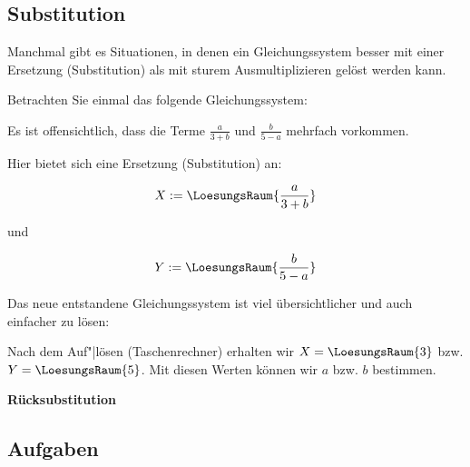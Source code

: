 \subsection{Substitution}
Manchmal gibt es Situationen, in denen ein Gleichungssystem besser mit
einer Ersetzung (Substitution) als mit sturem Ausmultiplizieren gelöst
werden kann.

Betrachten Sie einmal das folgende Gleichungssystem:


Es ist offensichtlich, dass die Terme $\frac{a}{3+b}$ und
$\frac{b}{5-a}$ mehrfach vorkommen.

Hier bietet sich eine Ersetzung (Substitution) an:

$$X := \LoesungsRaum{\frac{a}{3+b}}$$

und

$$Y := \LoesungsRaum{\frac{b}{5-a}}$$

Das neue entstandene Gleichungssystem ist viel übersichtlicher und
auch einfacher zu lösen:


Nach dem Auf"|lösen (\zB Taschenrechner) erhalten wir $X=\LoesungsRaum{3}$ bzw. $Y=\LoesungsRaum{5}$. Mit diesen Werten
können wir $a$ bzw. $b$ bestimmen.
\newpage

\textbf{Rücksubstitution}\,\\

\vspace{1mm}



\subsection*{Aufgaben}
